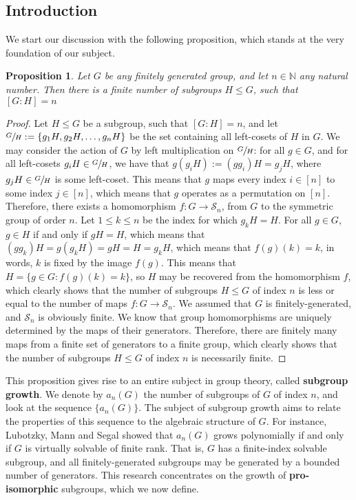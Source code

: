 \documentclass[12pt]{article}
\newtheorem{proposition}[theorem]{Proposition}
\begin{document}
\subsection{Introduction}
We start our discussion with the following proposition, which stands at the very foundation of our subject.
\begin{proposition} \label{prop:finite.number.subgroups}
Let $G$ be any finitely generated group, and let $n\in\mathbb{N}$ any natural number. Then there is a finite number of subgroups $H\leq G$, such that $[G:H]=n$
\end{proposition}
\begin{proof}
Let $H\leq G$ be a subgroup, such that $[G:H]=n$, and let $\sfrac{G}{H}:=\{g_1H,g_2H,\dots,g_nH\}$ be the set containing all left-cosets of $H$ in $G$. We may consider the action of $G$ by left multiplication on $\sfrac{G}{H}$: for all $g\in G$, and for all left-cosets $g_iH\in\sfrac{G}{H}$, we have that $g(g_iH):=(gg_i)H=g_jH$, where $g_jH\in\sfrac{G}{H}$ is some left-coset. This means that $g$ maps every index $i\in[n]$ to some index $j\in[n]$, which means that $g$ operates as a permutation on $[n]$. Therefore, there exists a homomorphism $f:G\rightarrow\mathcal{S}_n$, from $G$ to the symmetric group of order $n$. Let $1\leq k\leq n$ be the index for which $g_kH=H$. For all $g\in G$, $g\in H$ if and only if $gH=H$, which means that $(gg_k)H=g(g_kH)=gH=H=g_kH$, which means that $f(g)(k)=k$, in words, $k$ is fixed by the image $f(g)$. This means that $H=\{g\in G : f(g)(k)=k\}$, so $H$ may be recovered from the homomorphism $f$, which clearly shows that the number of subgroups $H\leq G$ of index $n$ is less or equal to the number of maps $f : G
\rightarrow\mathcal{S}_n$. We assumed that $G$ is finitely-generated, and $\mathcal{S}_n$ is obviously finite. We know that group homomorphisms are uniquely determined by the maps of their generators. Therefore, there are finitely many maps from a finite set of generators to a finite group, which clearly shows that the number of subgroups $H\leq G$ of index $n$ is necessarily finite.
\end{proof}
This proposition gives rise to an entire subject in group theory, called \textbf{subgroup growth}. We denote by $a_n(G)$ the number of subgroups of $G$ of index $n$, and look at the sequence $\{a_n(G)\}$. The subject of subgroup growth aims to relate the properties of this sequence to the algebraic structure of $G$. For instance, Lubotzky, Mann and Segal showed\cite{LubotzkyMannSegal} that $a_n(G)$ grows polynomially if and only if $G$ is virtually solvable of finite rank. That is, $G$ has a finite-index solvable subgroup, and all finitely-generated subgroups may be generated by a bounded number of generators. This research concentrates on the growth of \textbf{pro-isomorphic} subgroups, which we now define.
\end{document}
